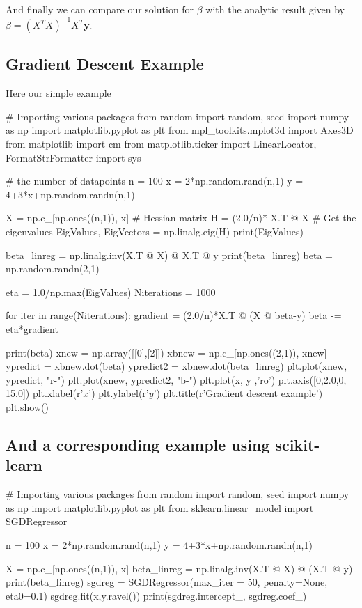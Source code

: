 \documentclass[%
oneside,                 %
final,                   %
10pt]{article}
\begin{document}
And finally we can compare our solution for $\beta$ with the analytic result given by 
$\beta= (X^TX)^{-1} X^T \mathbf{y}$.

\subsection{Gradient Descent Example}

Here our simple example
\bpycod

# Importing various packages
from random import random, seed
import numpy as np
import matplotlib.pyplot as plt
from mpl_toolkits.mplot3d import Axes3D
from matplotlib import cm
from matplotlib.ticker import LinearLocator, FormatStrFormatter
import sys

# the number of datapoints
n = 100
x = 2*np.random.rand(n,1)
y = 4+3*x+np.random.randn(n,1)

X = np.c_[np.ones((n,1)), x]
# Hessian matrix
H = (2.0/n)* X.T @ X
# Get the eigenvalues
EigValues, EigVectors = np.linalg.eig(H)
print(EigValues)

beta_linreg = np.linalg.inv(X.T @ X) @ X.T @ y
print(beta_linreg)
beta = np.random.randn(2,1)

eta = 1.0/np.max(EigValues)
Niterations = 1000

for iter in range(Niterations):
    gradient = (2.0/n)*X.T @ (X @ beta-y)
    beta -= eta*gradient

print(beta)
xnew = np.array([[0],[2]])
xbnew = np.c_[np.ones((2,1)), xnew]
ypredict = xbnew.dot(beta)
ypredict2 = xbnew.dot(beta_linreg)
plt.plot(xnew, ypredict, "r-")
plt.plot(xnew, ypredict2, "b-")
plt.plot(x, y ,'ro')
plt.axis([0,2.0,0, 15.0])
plt.xlabel(r'$x$')
plt.ylabel(r'$y$')
plt.title(r'Gradient descent example')
plt.show()

\epycod

\subsection{And a corresponding example using \textbf{scikit-learn}}

\bpycod
# Importing various packages
from random import random, seed
import numpy as np
import matplotlib.pyplot as plt
from sklearn.linear_model import SGDRegressor

n = 100
x = 2*np.random.rand(n,1)
y = 4+3*x+np.random.randn(n,1)

X = np.c_[np.ones((n,1)), x]
beta_linreg = np.linalg.inv(X.T @ X) @ (X.T @ y)
print(beta_linreg)
sgdreg = SGDRegressor(max_iter = 50, penalty=None, eta0=0.1)
sgdreg.fit(x,y.ravel())
print(sgdreg.intercept_, sgdreg.coef_)
\end{document}
